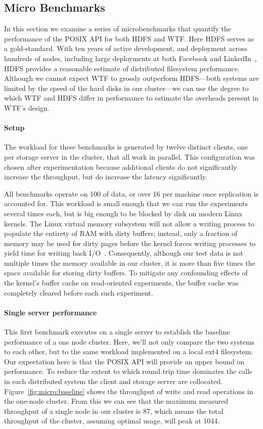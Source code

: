 \documentclass[twocolumn,10pt,letterpaper]{article}
\newcommand{\myparagraph}[1]{\vspace{-.25\baselineskip}\paragraph{#1}}
\begin{document}
\subsection{Micro Benchmarks}

In this section we examine a series of microbenchmarks that quantify the
performance of the POSIX API for both HDFS and WTF.  Here HDFS serves as a
gold-standard.  With ten years of active development, and deployment across
hundreds of nodes, including large deployments at both Facebook and
LinkedIn~\cite{copysets}, HDFS provides a reasonable estimate of distributed
filesystem performance.  Although we cannot expect WTF to grossly outperform
HDFS---both systems are limited by the speed of the hard disks in our
cluster---we can use the degree to which WTF and HDFS differ in performance to
estimate the overheads present in WTF's design.

\myparagraph{Setup} The workload for these benchmarks is generated by twelve
distinct clients, one per storage server in the cluster, that all work in
parallel.  This configuration was chosen after experimentation because
additional clients do not significantly increase the throughput, but do increase
the latency significantly.

All benchmarks operate on \unit{100}{\giga\byte} of data, or over
\unit{16}{\giga\byte} per machine once replication is accounted for.  This
workload is small enough that we can run the experiments several times each, but
is big enough to be blocked by disk on modern Linux kernels.  The Linux virtual
memory subsystem will not allow a writing process to populate the entirety of
RAM with dirty buffers; instead, only a fraction of memory may be used for dirty
pages before the kernel forces writing processes to yield time for writing back
I/O~\cite{linux-vm}.  Consequently, although our test data is not multiple times
the memory available in our cluster, it is more than five times the space
available for storing dirty buffers.  To mitigate any confounding effects of the
kernel's buffer cache on read-oriented experiments, the buffer cache was
completely cleared before each such experiment.

\myparagraph{Single server performance}  This first benchmark executes on a
single server to establish the baseline performance of a one node cluster.
Here, we'll not only compare the two systems to each other, but to the same
workload implemented on a local ext4 filesystem.  Our expectation here is that
the POSIX API will provide an upper bound on performance.  To reduce the extent
to which round trip time dominates the calls in each distributed system the
client and storage server are collocated.  Figure~\ref{fig:micro:baseline} shows
the throughput of write and read operations in the one-node cluster.  From this
we can see that the maximum measured throughput of a single node in our cluster
is \unit{87}{\mega\byte\per\second}, which means the total throughput of the
cluster, assuming optimal usage, will peak at
\unit{1044}{\mega\byte\per\second}.
\end{document}

